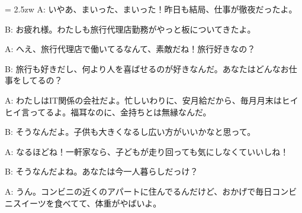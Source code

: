 \documentclass[11pt]{amsart}
\title{}
\author{}
\newenvironment{hangall}[1]{\hangindent = 2.5zw\everypar{\hangindent = 2.5zw}}{}
\begin{document}
\maketitle
\begin{hangall}{}%
A: いやあ、まいった、まいった！昨日も結局、仕事が徹夜だったよ。



B: お疲れ様。わたしも旅行代理店勤務がやっと板についてきたよ。



A: へえ、旅行代理店で働いてるなんて、素敵だね！旅行好きなの？



B: 旅行も好きだし、何より人を喜ばせるのが好きなんだ。あなたはどんなお仕事をしてるの？



A: わたしはIT関係の会社だよ。忙しいわりに、安月給だから、毎月月末はヒイヒイ言ってるよ。福耳なのに、金持ちとは無縁なんだ。



B: そうなんだよ。子供も大きくなるし広い方がいいかなと思って。



A: なるほどね！一軒家なら、子どもが走り回っても気にしなくていいしね！



B: そうなんだよね。あなたは今一人暮らしだっけ？



A: うん。コンビニの近くのアパートに住んでるんだけど、おかげで毎日コンビニスイーツを食べてて、体重がやばいよ。\end{hangall}
\end{document}
